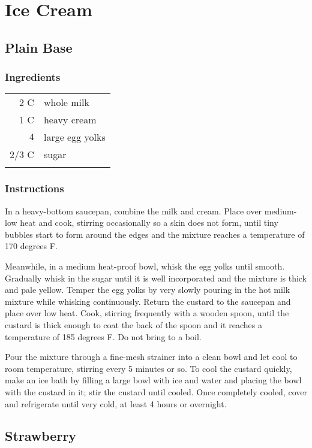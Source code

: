 \documentclass[12pt,landscape,twoside,twocolumn, openright, titlepage, draft]{book}
\begin{document}
\section{Ice Cream}

\subsection{Plain Base}
\subsubsection{Ingredients}
\begin{tabular}{r p{1.5in}}
$2$   C & whole milk            \\ 
$1$   C & heavy cream           \\ 
$4$     & large egg yolks       \\
$2/3$ C & sugar                 \\ \\
\end{tabular}
\subsubsection{Instructions}
In a heavy-bottom saucepan, combine the milk and cream. Place over medium-low heat and cook, stirring occasionally so a skin does not form, until tiny bubbles start to form around the edges and the mixture reaches a temperature of 170 degrees F.

Meanwhile, in a medium heat-proof bowl, whisk the egg yolks until smooth. Gradually whisk in the sugar until it is well incorporated and the mixture is thick and pale yellow. Temper the egg yolks by very slowly pouring in the hot milk mixture while whisking continuously. Return the custard to the saucepan and place over low heat. Cook, stirring frequently with a wooden spoon, until the custard is thick enough to coat the back of the spoon and it reaches a temperature of 185 degrees F. Do not bring to a boil.

Pour the mixture through a fine-mesh strainer into a clean bowl and let cool to room temperature, stirring every 5 minutes or so. To cool the custard quickly, make an ice bath by filling a large bowl with ice and water and placing the bowl with the custard in it; stir the custard until cooled. Once completely cooled, cover and refrigerate until very cold, at least 4 hours or overnight.

\subsection{Strawberry}
\end{document}
